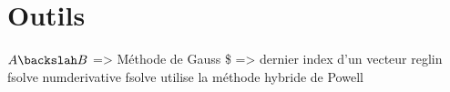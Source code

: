 \section{Outils}

$A\backslah B$ => Méthode de Gauss
\$ => dernier index d'un vecteur
reglin
fsolve
numderivative
fsolve utilise la méthode hybride de Powell
